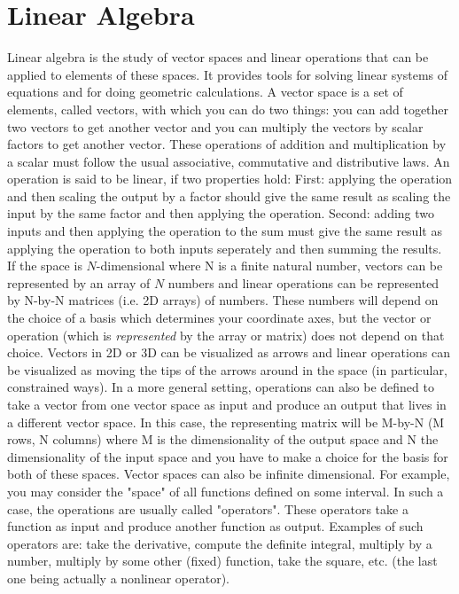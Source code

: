 \documentclass[12pt]{article}
\begin{document}
\section{Linear Algebra}
Linear algebra is the study of vector spaces and linear operations that can be applied to elements of these spaces. It provides tools for solving linear systems of equations and for doing geometric calculations. A vector space is a set of elements, called vectors, with which you can do two things: you can add together two vectors to get another vector and you can multiply the vectors by scalar factors to get another vector. These operations of addition and multiplication by a scalar must follow the usual associative, commutative and distributive laws. An operation is said to be linear, if two properties hold: First: applying the operation and then scaling the output by a factor should give the same result as scaling the input by the same factor and then applying the operation. Second: adding two inputs and then applying the operation to the sum must give the same result as applying the operation to both inputs seperately and then summing the results. If the space is $N$-dimensional where N is a finite natural number, vectors can be represented by an array of $N$ numbers and linear operations can be represented by N-by-N matrices (i.e. 2D arrays) of numbers. These numbers will depend on the choice of a basis which determines your coordinate axes, but the vector or operation (which is \emph{represented} by the array or matrix) does not depend on that choice. Vectors in 2D or 3D can be visualized as arrows and linear operations can be visualized as moving the tips of the arrows around in the space (in particular, constrained ways). In a more general setting, operations can also be defined to take a vector from one vector space as input and produce an output that lives in a different vector space. In this case, the representing matrix will be M-by-N (M rows, N columns) where M is the dimensionality of the output space and N the dimensionality of the input space and you have to make a choice for the basis for both of these spaces. Vector spaces can also be infinite dimensional. For example, you may consider the "space" of all functions defined on some interval. In such a case, the operations are usually called "operators". These operators take a function as input and produce another function as output. Examples of such operators are: take the derivative, compute the definite integral, multiply by a number, multiply by some other (fixed) function, take the square, etc. (the last one being actually a nonlinear operator).
\end{document}

